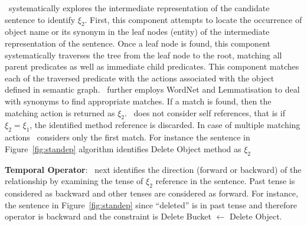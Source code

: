 
\tool\ systematically explores the intermediate representation
of the candidate sentence to identify $\xi_2$. First, this component
attempts to locate the occurrence of object name or its synonym
in the leaf nodes (entity) of the intermediate
representation of the sentence.
Once a leaf node is found, this component systematically
traverses the tree from the leaf node to the root,
matching all parent predicates as well as immediate child
predicates.
This component matches each of the traversed predicate
with the actions associated with the object defined in
semantic graph. 
\tool\ further employs WordNet and Lemmatisation to deal with
synonyms to find appropriate matches. If a match is
found, then the matching action is returned as $\xi_2$.
\tool\ does not consider self references, that is if $\xi_2 = \xi_1$, the identified method reference is discarded.
In case of multiple matching actions \tool\ considers only the first match.
For instance the sentence in Figure~\ref{fig:standep} algorithm identifies
Delete Object method as $\xi_2$

\textbf{Temporal Operator}:
\tool\ next identifies the direction (forward or backward) of the relationship by examining the tense of $\xi_2$ reference in the sentence. Past tense is considered as backward and other tenses are considered as forward. For instance, the sentence in Figure~\ref{fig:standep} since ``deleted'' is in past tense and therefore operator is backward and the constraint is 
Delete Bucket $\leftarrow$ Delete Object.

